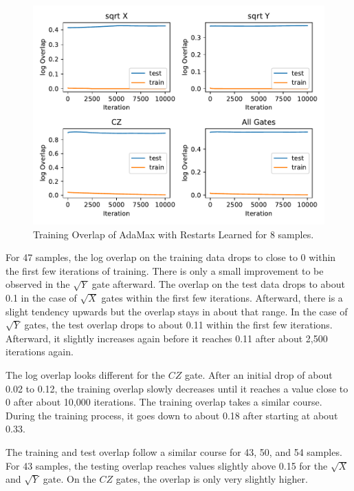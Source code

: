 \begin{figure}[H]
  \centering
  \includegraphics[width=\textwidth]{figures/results/AM-restarts-learned/avgOverlap_8.pdf}
  \caption[Training Overlap of AdaMax with Restarts Learned]{Training 
  Overlap of AdaMax with Restarts Learned for 8 samples.}
  \label{fig:sr_tvd}
\end{figure}

For 47 samples, the log overlap on the training data drops to close to 0 within the first few iterations 
of training. There is only a small improvement to be observed in the $\sqrt{Y}$ gate afterward. 
The overlap on the test data drops to about 0.1 in the case of $\sqrt{X}$ gates within the first few iterations.
Afterward, there is a slight tendency upwards but the overlap stays in about that range. In the case 
of $\sqrt{Y}$ gates, the test overlap drops to about 0.11 within the first few iterations. Afterward, 
it slightly increases again before it reaches 0.11 after about 2,500 iterations again.

The log overlap looks different for the $CZ$ gate. After an initial drop of about 0.02 to 0.12, the 
training overlap slowly decreases until it reaches a value close to 0 after about 10,000 iterations. The 
training overlap takes a similar course. During the training process, it goes down to about 0.18 after 
starting at about 0.33.

The training and test overlap follow a similar course for 43, 50, and 54 samples. For 43 samples, the 
testing overlap reaches values slightly above 0.15 for the $\sqrt{X}$ and $\sqrt{Y}$ gate. On the $CZ$ gates, 
the overlap is only very slightly higher.


